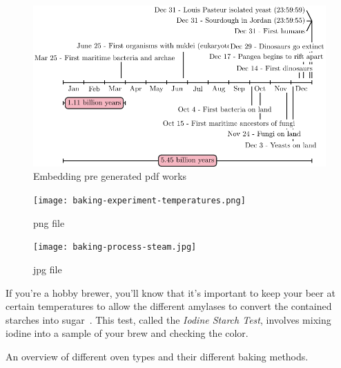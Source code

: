 \documentclass[paper=a4, twoside=false, fontsize=12pt, parskip=half,
                bibliography=totoc, listof=totoc]{scrbook}
\begin{document}
\begin{figure}[!htb]
  \includegraphics{figures/fig-life-planet-sourdough-timeline-external.pdf}
  \caption{Embedding pre generated pdf works}
\end{figure}

\begin{figure}[!htb]
  \texttt{[image: baking-experiment-temperatures.png]}
  \caption[Surface temperature for different steaming methods]{png file}
\end{figure}

\begin{figure}[!htb]
  \texttt{[image: baking-process-steam.jpg]}
  \caption[Steam building with inverted tray]{jpg file}%
      \label{flc:inverted-tray}
\end{figure}
If you're a hobby brewer, you'll know that it's important to keep your beer at
certain temperatures to allow the different amylases to convert the contained
starches into sugar~\cite{beer+amylase}.
This test, called the \emph{Iodine Starch Test}, involves mixing iodine into
a sample of your brew and checking the color.

\begin{table}[!htb]
    \begin{center}
        
        \caption[Different oven types]{An overview of different oven types and their
            different baking methods.}
    \end{center}
\end{table}
{%
\hypersetup{hidelinks}
\listofflowcharts
\listoftables
\listoffigures
}
\printbibliography
\end{document}
